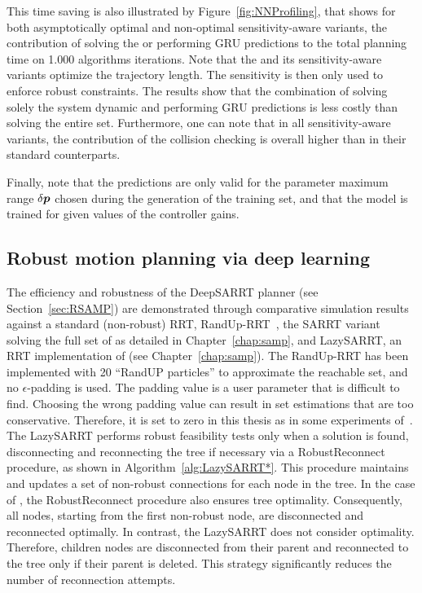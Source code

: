 This time saving is also illustrated by Figure~\ref{fig:NNProfiling}, that shows for both asymptotically optimal and non-optimal sensitivity-aware variants, the contribution of solving the  or performing GRU predictions to the total planning time on 1.000 algorithms iterations.
Note that the  and its sensitivity-aware variants optimize the trajectory length.
The sensitivity is then only used to enforce robust constraints.
The results show that the combination of solving solely the system dynamic and performing GRU predictions is less costly than solving the entire  set.
Furthermore, one can note that in all sensitivity-aware variants, the contribution of the collision checking is overall higher than in their standard counterparts.

Finally, note that the predictions are only valid for the parameter maximum range $\delta\boldsymbol{p}$ chosen during the generation of the training set, and that the model is trained for given values of the controller gains.

\subsection{Robust motion planning via deep learning} \label{sec:RobustPlanSimu}

The efficiency and robustness of the DeepSARRT planner (see Section~\ref{sec:RSAMP}) are demonstrated through comparative simulation results against a standard (non-robust) RRT, RandUp-RRT~\cite{cRandUpRRT}, the SARRT variant solving the full set of  as detailed in Chapter~\ref{chap:samp}, and LazySARRT, an RRT implementation of  (see Chapter~\ref{chap:samp}).
The RandUp-RRT has been implemented with 20 ``RandUP particles'' to approximate the reachable set, and no $\epsilon$-padding is used.
The padding value is a user parameter that is difficult to find. 
Choosing the wrong padding value can result in set estimations that are too conservative. 
Therefore, it is set to zero in this thesis as in some experiments of~\cite{cRandUpRRT}.
The LazySARRT performs robust feasibility tests only when a solution is found, disconnecting and reconnecting the tree if necessary via a RobustReconnect procedure, as shown in Algorithm~\ref{alg:LazySARRT*}. 
This procedure  maintains and updates a set of non-robust connections for each node in the tree. In the case of , the RobustReconnect procedure also ensures tree optimality. 
Consequently, all nodes, starting from the first non-robust node, are disconnected and reconnected optimally.
In contrast, the LazySARRT does not consider optimality. 
Therefore, children nodes are disconnected from their parent and reconnected to the tree only if their parent is deleted.
This strategy significantly reduces the number of reconnection attempts.

